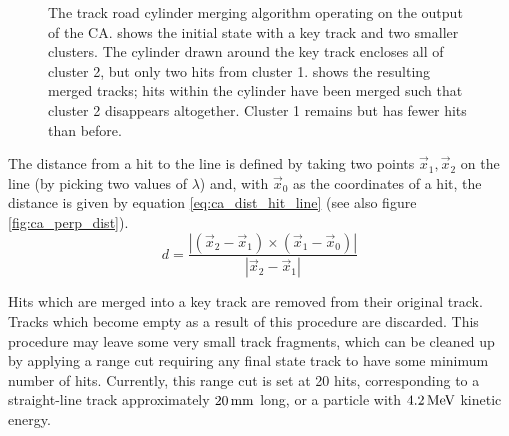 \begin{figure}
\centering
{}
\caption[Track road merging algorithm operating on clustered hits]{\label{fig:ca_merging_cylinder}The track road cylinder merging algorithm operating on the output of the \ac{CA}.  shows the initial state with a key track and two smaller clusters. The cylinder drawn around the key track encloses all of cluster 2, but only two hits from cluster 1.  shows the resulting merged tracks; hits within the cylinder have been merged such that cluster 2 disappears altogether. Cluster 1 remains but has fewer hits than before.}
\end{figure}

The distance from a hit to the line is defined by taking two points $\vec{x}_1, \vec{x}_2$ on the line (by picking two values of $\lambda$) and, with $\vec{x}_0$ as the coordinates of a hit, the distance is given by equation \ref{eq:ca_dist_hit_line} (see also figure \ref{fig:ca_perp_dist}).
\begin{equation}\label{eq:ca_dist_hit_line}
d = \frac{|(\vec{x}_2 - \vec{x}_1) \times (\vec{x}_1 - \vec{x}_0)|}{|\vec{x}_2 - \vec{x}_1|}
\end{equation}

Hits which are merged into a key track are removed from their original track. Tracks which become empty as a result of this procedure are discarded. This procedure may leave some very small track fragments, which can be cleaned up by applying a range cut requiring any final state track to have some minimum number of hits. Currently, this range cut is set at 20 hits, corresponding to a straight-line track approximately $20\,\mathrm{mm}$ long, or a particle with $4.2\,\mathrm{MeV}$ kinetic energy.

